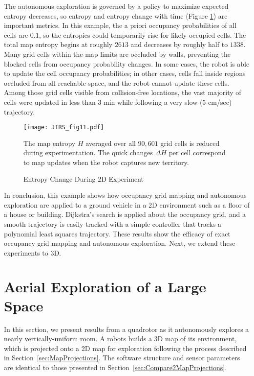 The autonomous exploration is governed by a policy to maximize expected entropy decreases, so entropy and entropy change with time (Figure \ref{fig:ExperimentH}) are important metrics. In this example, the a priori occupancy probabilities of all cells are $0.1$, so the entropies could temporarily rise for likely occupied cells. The total map entropy begins at roughly $2613$ and decreases by roughly half to $1338$. Many grid cells within the map limits are occluded by walls, preventing the blocked cells from occupancy probability changes. In some cases, the robot is able to update the cell occupancy probabilities; in other cases, cells fall inside regions occluded from all reachable space, and the robot cannot update these cells. Among those grid cells visible from collision-free locations, the vast majority of cells were updated in less than $3$ min while following a very slow ($5$ cm/sec) trajectory.

\begin{figure}
	\centering
	\texttt{[image: JIRS\_fig11.pdf]}
	\caption{Entropy Change During 2D Experiment}
	\medskip
	\small
	The map entropy $H$ averaged over all $90,601$ grid cells is reduced during experimentation. The quick changes $\Delta H$ per cell correspond to map updates when the robot captures new territory.
	\label{fig:ExperimentH}
\end{figure}

In conclusion, this example shows how occupancy grid mapping and autonomous exploration are applied to a ground vehicle in a 2D environment such as a floor of a house or building. Dijkstra's search is applied about the occupancy grid, and a smooth trajectory is easily tracked with a simple controller that tracks a polynomial least squares trajectory. These results show the efficacy of exact occupancy grid mapping and autonomous exploration. Next, we extend these experiments to 3D.




\section{Aerial Exploration of a Large Space}
\label{sec:QuadrotorNRL}


In this section, we present results from a quadrotor as it autonomously explores a nearly vertically-uniform room. A robots builds a 3D map of its environment, which is projected onto a 2D map for exploration following the process described in Section~\ref{sec:MapProjections}. The software structure and sensor parameters are identical to those presented in Section~\ref{sec:Compare2MapProjections}.

